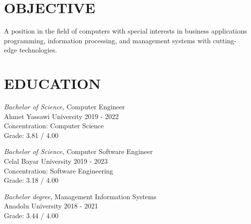 \documentclass[line,margin]{res}
\begin{document}
\address{emre.yildiz.dev@hotmail.com}
\address{\href{https://linkedin.com/in/emre-yildiz-297ab0242}{https://linkedin.com/in/emre-yildiz-297ab0242}} 


 
\begin{resume}
 
\section{OBJECTIVE}       A position in the field of computers with special 
                interests in business applications programming, 
                information processing, and management systems with cutting-edge technologies. 
 
 
\section{EDUCATION} {\sl Bachelor of Science,} Computer Engineer \\
                Ahmet Yassawi University 
                2019 - 2022 \\
                Concentration: Computer Science \\
                Grade: 3.81 / 4.00 

                {\sl Bachelor of Science,} Computer Software Engineer \\
                Celal Bayar University 
                2019 - 2023 \\
                Concentration: Software Engineering \\
                Grade: 3.18 / 4.00 
                
                {\sl Bachelor degree,} Management Information Systems \\
                Anadolu University 
                2018 - 2021 \\
                Grade: 3.44 / 4.00 


\end{resume}
\end{document}
